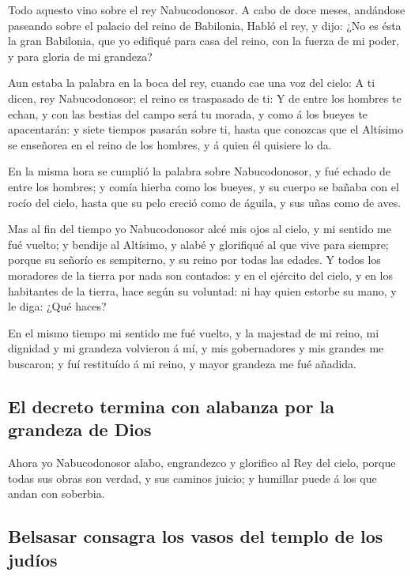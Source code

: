  Todo aquesto vino sobre el rey Nabucodonosor.
 A cabo de doce meses, andándose paseando sobre el
palacio del reino de Babilonia,  Habló el rey, y dijo:
¿No es ésta la gran Babilonia, que yo edifiqué para casa del reino, con
la fuerza de mi poder, y para gloria de mi grandeza?

 Aun estaba la palabra en la boca del rey, cuando cae una
voz del cielo: A ti dicen, rey Nabucodonosor; el reino es traspasado de
ti:  Y de entre los hombres te echan, y con las bestias
del campo será tu morada, y como á los bueyes te apacentarán: y siete
tiempos pasarán sobre ti, hasta que conozcas que el Altísimo se
enseñorea en el reino de los hombres, y á quien él quisiere lo da.

 En la misma hora se cumplió la palabra sobre
Nabucodonosor, y fué echado de entre los hombres; y comía hierba como
los bueyes, y su cuerpo se bañaba con el rocío del cielo, hasta que su
pelo creció como de águila, y sus uñas como de aves.

 Mas al fin del tiempo yo Nabucodonosor alcé mis ojos al
cielo, y mi sentido me fué vuelto; y bendije al Altísimo, y alabé y
glorifiqué al que vive para siempre; porque su señorío es sempiterno, y
su reino por todas las edades.  Y todos los moradores de
la tierra por nada son contados: y en el ejército del cielo, y en los
habitantes de la tierra, hace según su voluntad: ni hay quien estorbe su
mano, y le diga: ¿Qué haces?

 En el mismo tiempo mi sentido me fué vuelto, y la
majestad de mi reino, mi dignidad y mi grandeza volvieron á mí, y mis
gobernadores y mis grandes me buscaron; y fuí restituído á mi reino, y
mayor grandeza me fué añadida.

\hypertarget{el-decreto-termina-con-alabanza-por-la-grandeza-de-dios}{%
\subsection{El decreto termina con alabanza por la grandeza de
Dios}\label{el-decreto-termina-con-alabanza-por-la-grandeza-de-dios}}

 Ahora yo Nabucodonosor alabo, engrandezco y glorifico al
Rey del cielo, porque todas sus obras son verdad, y sus caminos juicio;
y humillar puede á los que andan con soberbia.

\hypertarget{belsasar-consagra-los-vasos-del-templo-de-los-juduxedos}{%
\subsection{Belsasar consagra los vasos del templo de los
judíos}\label{belsasar-consagra-los-vasos-del-templo-de-los-juduxedos}}

